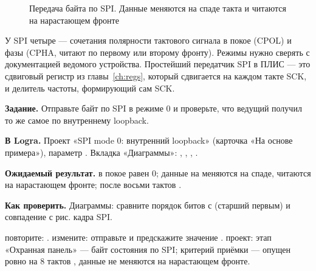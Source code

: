 \begin{figure}[H]
\centering
{}
\caption{Передача байта  по SPI. Данные меняются на спаде такта и читаются на нарастающем фронте}
\end{figure}

У SPI четыре  --- сочетания полярности тактового сигнала в
покое (CPOL) и фазы (CPHA, читают по первому или второму фронту). Режимы
нужно сверять с документацией ведомого устройства. Простейший передатчик SPI
в ПЛИС --- это сдвиговый регистр из главы~\ref{ch:regs}, который сдвигается на
каждом такте SCK, и делитель частоты, формирующий сам SCK.

\begin{diybox}
\textbf{Задание.} Отправьте байт  по SPI в режиме 0 и проверьте, что ведущий получил то же самое по внутреннему loopback.

\textbf{В Logra.} Проект «SPI mode 0: внутренний loopback» (карточка «На основе примера»), параметр . Вкладка «Диаграммы»: , , , .

\textbf{Ожидаемый результат.}  в покое равен 0; данные на  меняются на спаде, читаются на нарастающем фронте; после восьми тактов .

\textbf{Как проверить.} Диаграммы: сравните порядок битов  с  (старший первым) и совпадение с рис. кадра SPI.

 повторите: .  измените: отправьте  и предскажите значение .  проект: этап «Охранная панель» --- байт состояния по SPI; критерий приёмки ---  опущен ровно на 8 тактов , данные не меняются на нарастающем фронте.
\end{diybox}

